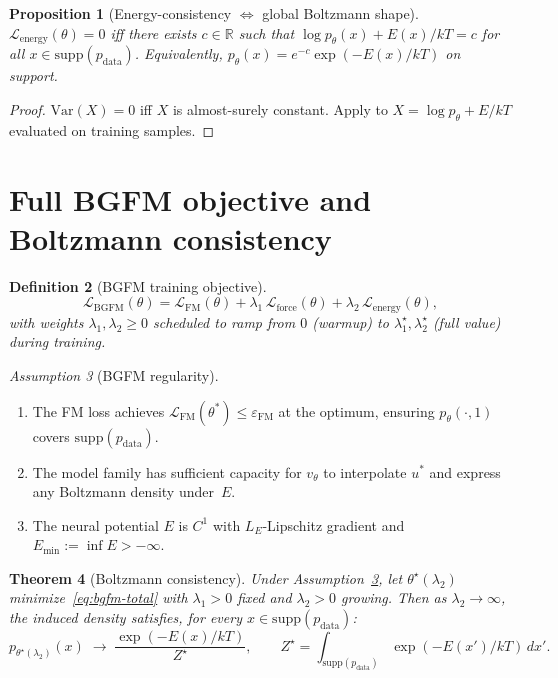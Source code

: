 \documentclass[11pt]{article}
\newtheorem{theorem}{Theorem}
\newtheorem{proposition}[theorem]{Proposition}
\newtheorem{definition}[theorem]{Definition}
\theoremstyle{remark}
\newtheorem{assumption}[theorem]{Assumption}
\theoremstyle{plain}
\newcommand{\R}{\mathbb{R}}
\newcommand{\FM}{\mathrm{FM}}
\newcommand{\force}{\mathrm{force}}
\newcommand{\energy}{\mathrm{energy}}
\newcommand{\BGFM}{\mathrm{BGFM}}
\newcommand{\Var}{\mathrm{Var}}
\begin{document}
\begin{proposition}[Energy-consistency $\Leftrightarrow$ global
Boltzmann shape]\label{prop:energy-equiv}
$\mathcal{L}_\energy(\theta) = 0$ iff there exists $c \in \R$ such that
$\log p_\theta(x) + E(x)/kT = c$ for all $x \in \mathrm{supp}(p_\text{data})$.
Equivalently, $p_\theta(x) = e^{-c} \exp(-E(x)/kT)$ on support.
\end{proposition}

\begin{proof}
$\Var(X) = 0$ iff $X$ is almost-surely constant. Apply to $X = \log
p_\theta + E/kT$ evaluated on training samples.
\end{proof}

\section{Full BGFM objective and Boltzmann consistency}

\begin{definition}[BGFM training objective]
\begin{equation}\label{eq:bgfm-total}
\mathcal{L}_\BGFM(\theta)
  = \mathcal{L}_\FM(\theta)
  + \lambda_1\, \mathcal{L}_\force(\theta)
  + \lambda_2\, \mathcal{L}_\energy(\theta),
\end{equation}
with weights $\lambda_1, \lambda_2 \ge 0$ scheduled to ramp from $0$
(warmup) to $\lambda_1^\star, \lambda_2^\star$ (full value) during
training.
\end{definition}

\begin{assumption}[BGFM regularity]\label{assum:bgfm}
\begin{enumerate}
\item[(B1)] The FM loss achieves $\mathcal{L}_\FM(\theta^*) \le \varepsilon_\FM$
      at the optimum, ensuring $p_\theta(\cdot, 1)$ covers
      $\mathrm{supp}(p_\text{data})$.
\item[(B2)] The model family has sufficient capacity for
      $v_\theta$ to interpolate $u^*$ and express any Boltzmann density
      under~$E$.
\item[(B3)] The neural potential $E$ is $C^1$ with $L_E$-Lipschitz
      gradient and $E_{\min} := \inf E > -\infty$.
\end{enumerate}
\end{assumption}

\begin{theorem}[Boltzmann consistency]\label{thm:boltzmann}
Under Assumption~\ref{assum:bgfm}, let $\theta^\star(\lambda_2)$
minimize~\eqref{eq:bgfm-total} with $\lambda_1 > 0$ fixed and
$\lambda_2 > 0$ growing. Then as $\lambda_2 \to \infty$, the induced
density satisfies, for every $x \in \mathrm{supp}(p_\text{data})$:
\[
p_{\theta^\star(\lambda_2)}(x) \;\longrightarrow\; \frac{\exp(-E(x)/kT)}{Z^\star},
\qquad Z^\star = \int_{\mathrm{supp}(p_\text{data})} \exp(-E(x')/kT)\, dx'.
\]
\end{theorem}
\end{document}
